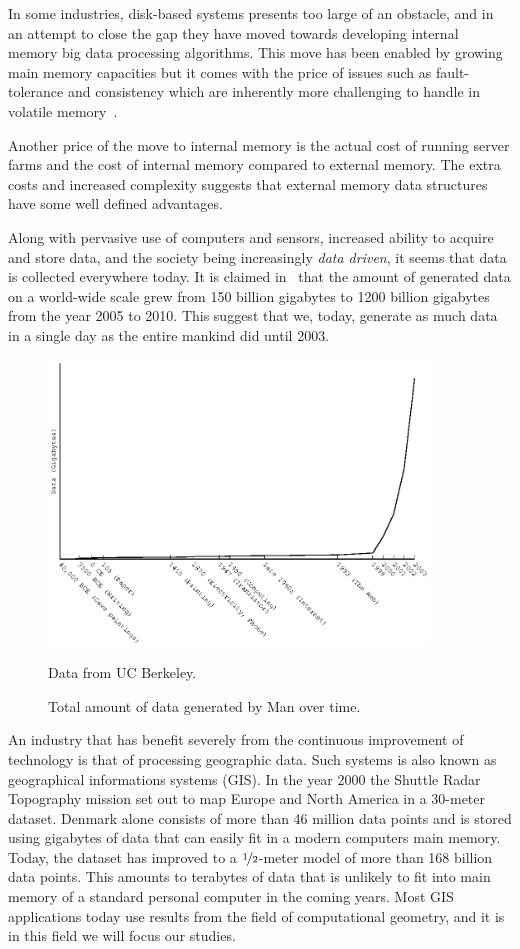 \documentclass[twoside,11pt,openright]{report}
\begin{document}
In some industries, disk-based systems presents too large of an obstacle, and in an attempt to close the gap they have moved towards developing internal memory big data processing algorithms. This move has been enabled by growing main memory capacities but it comes with the price of issues such as fault-tolerance and consistency which are inherently more challenging to handle in volatile memory~\cite{Zhang2015}.

Another price of the move to internal memory is the actual cost of running server farms and the cost of internal memory compared to external memory. The extra costs and increased complexity suggests that external memory data structures have some well defined advantages.

Along with pervasive use of computers and sensors, increased ability to acquire and store data, and the society being increasingly \textit{data driven}, it seems that data is collected everywhere today. It is claimed in~\cite{economist:0210} that the amount of generated data on a world-wide scale grew from 150 billion gigabytes to 1200 billion gigabytes from the year 2005 to 2010. This suggest that we, today, generate as much data in a single day as the entire mankind did until 2003.

\begin{figure}[h]
	\centering
		\includegraphics[width=0.9\textwidth]{../plots/massive_data/massive_data}
	\caption{Total amount of data generated by Man over time.}
	\tiny{Data from UC Berkeley.}
	\label{fig:massive_data}
\end{figure}

An industry that has benefit severely from the continuous improvement of technology is that of processing geographic data. Such systems is also known as geographical informations systems (GIS). In the year 2000 the Shuttle Radar Topography mission set out to map Europe and North America in a 30-meter dataset. Denmark alone consists of more than 46 million data points and is stored using gigabytes of data that can easily fit in a modern computers main memory. Today, the dataset has improved to a $\nicefrac{1}{2}$-meter model of more than 168 billion data points. This amounts to terabytes of data that is unlikely to fit into main memory of a standard personal computer in the coming years. Most GIS applications today use results from the field of computational geometry, and it is in this field we will focus our studies.
\end{document}
